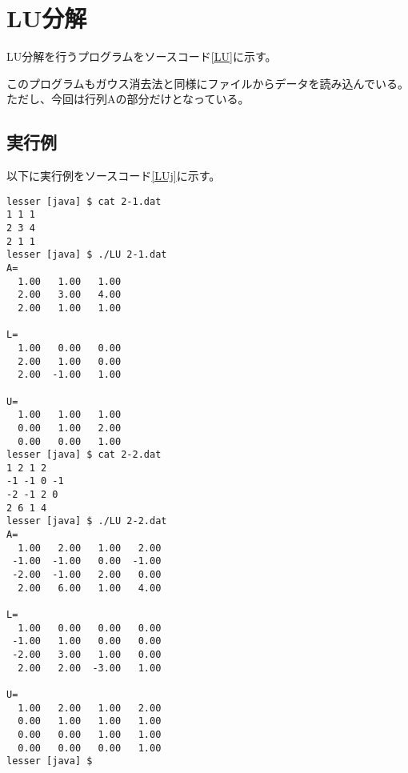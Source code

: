 \documentclass{jsarticle}
\begin{document}
\section{LU分解}
LU分解を行うプログラムをソースコード\ref{LU}に示す。


このプログラムもガウス消去法と同様にファイルからデータを読み込んでいる。ただし、今回は行列Aの部分だけとなっている。
\subsection{実行例}
以下に実行例をソースコード\ref{LUj}に示す。
\begin{lstlisting}[caption=LU分解の実行結果,label=LUj]
lesser [java] $ cat 2-1.dat 
1 1 1
2 3 4
2 1 1
lesser [java] $ ./LU 2-1.dat 
A=
  1.00   1.00   1.00 
  2.00   3.00   4.00 
  2.00   1.00   1.00 

L=
  1.00   0.00   0.00 
  2.00   1.00   0.00 
  2.00  -1.00   1.00 

U=
  1.00   1.00   1.00 
  0.00   1.00   2.00 
  0.00   0.00   1.00 
lesser [java] $ cat 2-2.dat 
1 2 1 2
-1 -1 0 -1
-2 -1 2 0
2 6 1 4
lesser [java] $ ./LU 2-2.dat 
A=
  1.00   2.00   1.00   2.00 
 -1.00  -1.00   0.00  -1.00 
 -2.00  -1.00   2.00   0.00 
  2.00   6.00   1.00   4.00 

L=
  1.00   0.00   0.00   0.00 
 -1.00   1.00   0.00   0.00 
 -2.00   3.00   1.00   0.00 
  2.00   2.00  -3.00   1.00 

U=
  1.00   2.00   1.00   2.00 
  0.00   1.00   1.00   1.00 
  0.00   0.00   1.00   1.00 
  0.00   0.00   0.00   1.00 
lesser [java] $ 
\end{lstlisting}
\end{document}
